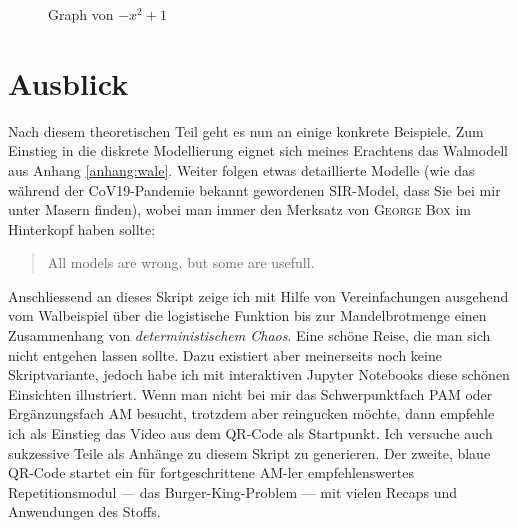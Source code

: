\documentclass[%
11pt,%
twoside,%
titlepage,%
german,%
headsepline%
]{scrartcl}
\newcounter{theo}[section]\setcounter{theo}{0}
\begin{document}
\begin{figure}
\centering
{}
\caption{Graph von $-x^2+1$}\label{graph:parabelplus1}
\end{figure}

\clearpage

\section{Ausblick}

Nach
diesem theoretischen Teil geht es nun an einige konkrete Beispiele. Zum Einstieg in die diskrete Modellierung eignet sich meines Erachtens das Walmodell aus Anhang \ref{anhang:wale}. Weiter folgen etwas detaillierte Modelle (wie das während der CoV19-Pandemie bekannt gewordenen SIR-Model, dass Sie bei mir unter Masern finden), wobei man immer den Merksatz von \textsc{George Box} im Hinterkopf haben sollte:

\begin{quote}
    All models are wrong, but some are usefull.
\end{quote}

Anschliessend
an dieses Skript zeige ich mit Hilfe von Vereinfachungen ausgehend vom Walbeispiel über die logistische Funktion bis zur Mandelbrotmenge einen Zusammenhang von \emph{deterministischem Chaos}. Eine schöne Reise, die man sich nicht entgehen lassen sollte. Dazu existiert aber meinerseits noch keine Skriptvariante, jedoch habe ich mit interaktiven Jupyter Notebooks diese schönen Einsichten illustriert. Wenn man nicht bei mir das Schwerpunktfach PAM oder Ergänzungsfach AM besucht, trotzdem aber reingucken möchte, dann empfehle ich als Einstieg das Video aus dem QR-Code als Startpunkt. Ich versuche auch sukzessive Teile als Anhänge zu diesem Skript zu generieren. Der
zweite, blaue QR-Code startet ein für fortgeschrittene AM-ler empfehlenswertes Repetitionsmodul --- das Burger-King-Problem --- mit vielen Recaps und Anwendungen des Stoffs.
\end{document}
